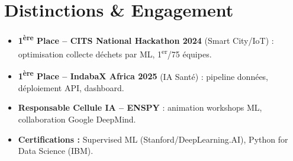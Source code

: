 \documentclass[a4paper,11pt]{article}
\begin{document}
\section{Distinctions \& Engagement}
\begin{itemize}[leftmargin=*, nosep, label=\tiny$\bullet$]
    \item \small{\textbf{1\textsuperscript{ère} Place -- CITS National Hackathon 2024} (Smart City/IoT) : optimisation collecte déchets par ML, 1\textsuperscript{er}/75 équipes.}
    \item \small{\textbf{1\textsuperscript{ère} Place -- IndabaX Africa 2025} (IA Santé) : pipeline données, déploiement API, dashboard.}
    \item \small{\textbf{Responsable Cellule IA -- ENSPY} : animation workshops ML, collaboration Google DeepMind.}
    \item \small{\textbf{Certifications :} Supervised ML (Stanford/DeepLearning.AI), Python for Data Science (IBM).}
\end{itemize}
\end{document}
